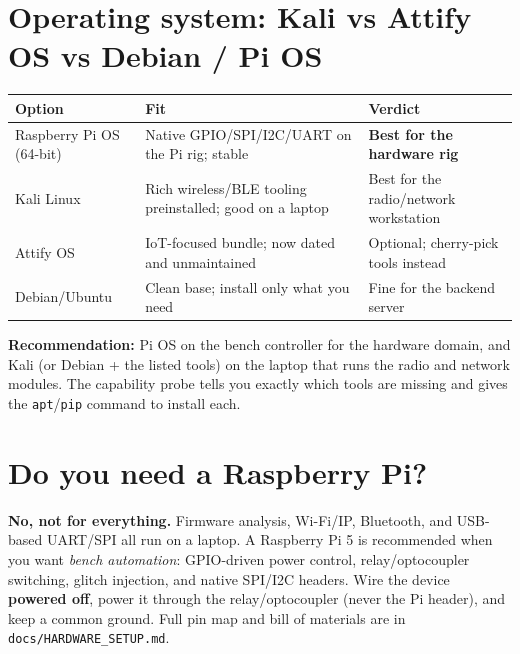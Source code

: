 \documentclass[11pt]{article}
\newif\ifintable\intablefalse
\begin{document}
\section{Operating system: Kali vs Attify OS vs Debian / Pi OS}
\begin{table}[h]
\centering\footnotesize\intabletrue
\begin{tabularx}{\textwidth}{@{}L{3cm} X L{3.4cm}@{}}
\toprule
\textbf{Option} & \textbf{Fit} & \textbf{Verdict}\\
\midrule
Raspberry Pi OS (64-bit) & Native GPIO/SPI/I2C/UART on the Pi rig; stable & \textbf{Best for the hardware rig}\\
Kali Linux & Rich wireless/BLE tooling preinstalled; good on a laptop & Best for the radio/network workstation\\
Attify OS & IoT-focused bundle; now dated and unmaintained & Optional; cherry-pick tools instead\\
Debian/Ubuntu & Clean base; install only what you need & Fine for the backend server\\
\bottomrule
\end{tabularx}
\end{table}
\textbf{Recommendation:} Pi OS on the bench controller for the hardware domain,
and Kali (or Debian + the listed tools) on the laptop that runs the radio and
network modules. The capability probe tells you exactly which tools are missing
and gives the \texttt{apt}/\texttt{pip} command to install each.

\section{Do you need a Raspberry Pi?}
\textbf{No, not for everything.} Firmware analysis, Wi-Fi/IP, Bluetooth, and
USB-based UART/SPI all run on a laptop. A Raspberry Pi 5 is recommended when you
want \emph{bench automation}: GPIO-driven power control, relay/optocoupler
switching, glitch injection, and native SPI/I2C headers. Wire the device
\textbf{powered off}, power it through the relay/optocoupler (never the Pi
header), and keep a common ground. Full pin map and bill of materials are in
\texttt{docs/HARDWARE\_SETUP.md}.

\end{document}
